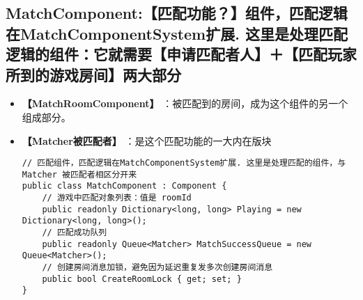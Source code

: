 \documentclass[9pt, b5paper]{article}
\begin{document}
\subsection{MatchComponent:【匹配功能？】组件，匹配逻辑在MatchComponentSystem扩展. 这里是处理匹配逻辑的组件：它就需要【申请匹配者人】＋【匹配玩家所到的游戏房间】两大部分}
\label{sec-1-3}
\begin{itemize}
\item \textbf{【MatchRoomComponent】} ：被匹配到的房间，成为这个组件的另一个组成部分。
\item \textbf{【Matcher被匹配者】} ：是这个匹配功能的一大内在版块
\begin{verbatim}
// 匹配组件，匹配逻辑在MatchComponentSystem扩展. 这里是处理匹配的组件，与 Matcher 被匹配者相区分开来
public class MatchComponent : Component {
    // 游戏中匹配对象列表：值是 roomId
    public readonly Dictionary<long, long> Playing = new Dictionary<long, long>();
    // 匹配成功队列
    public readonly Queue<Matcher> MatchSuccessQueue = new Queue<Matcher>();
    // 创建房间消息加锁，避免因为延迟重复发多次创建房间消息
    public bool CreateRoomLock { get; set; }
}
\end{verbatim}
\end{itemize}
\end{document}

